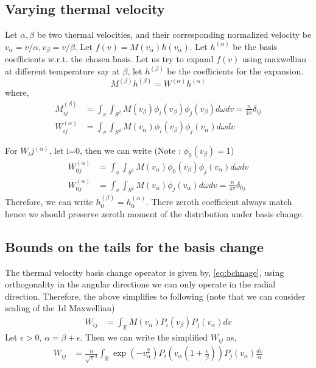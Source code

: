 \documentclass{article}
\newcommand{\reals}{\mathbb{R}}
\begin{document}
\subsection{Varying thermal velocity}
Let $\alpha,\beta$ be two thermal velocities, and their corresponding normalized velocity be $v_\alpha=v/\alpha,v_\beta=v/\beta$.
Let $f(v) = M(v_\alpha) h(v_\alpha)$. Let $h^{(\alpha)}$ be the basis coefficients w.r.t. the chosen basis. Let us try to expand $f(v)$ using maxwellian at different temperature say at $\beta$, let $h^{(\beta)}$ be the coefficients for the expansion.
\begin{equation}
    M^{(\beta)} h^{(\beta)} = W^{(\alpha)} h^{(\alpha)}
\end{equation} where, 
\begin{align}
    M^{(\beta)}_{ij} &= \int_{v} \int_{S^2} M(v_\beta) \phi_i(v_\beta) \phi_j(v_\beta) d\omega dv  = \frac{n}{4\pi} \delta_{ij} \\
    W^{(\alpha)}_{ij} &= \int_{v} \int_{S^2} M(v_\alpha) \phi_i(v_\beta) \phi_j(v_\alpha) d\omega dv   \label{eq:bchnage}
\end{align}

For $W_ij^{(\alpha)}$, let i=0, then we can write (Note : $\phi_0(v_\beta)=1$)
\begin{align*}
    W^{(\alpha)}_{0j} &= \int_{v} \int_{S^2} M(v_\alpha) \phi_0(v_\beta) \phi_j(v_\alpha) d\omega dv\\
    W^{(\alpha)}_{0j} &= \int_{v} \int_{S^2} M(v_\alpha) \phi_j(v_\alpha) d\omega dv = \frac{n}{4\pi} \delta_{0j}
\end{align*}
Therefore, we can write $h^{(\beta)}_0=h^{(\alpha)}_0$. There zeroth coefficient always match hence we should preserve zeroth moment of the distribution under basis change.  

\subsection{Bounds on the tails for the basis change}
The thermal velocity basis change operator is given by, \eqref{eq:bchnage}, using orthogonality in the angular directions we can only operate in the radial direction. Therefore, the above simplifies to following (note that we can consider scaling of the 1d Maxwellian)
\begin{align}
    W_{ij} &= \int_{\reals} M(v_\alpha) P_i(v_\beta) P_j(v_\alpha)dv \label{eq:basis_change}
\end{align}
Let $\epsilon >0$, $\alpha = \beta + \epsilon$. Then we can write the simplified $W_{ij}$ as, 
\begin{align}
    W_{ij} &= \frac{n}{\sqrt{\pi}^{3}}  \int_{\reals}  \exp(-v_\alpha^2) P_i (v_\alpha (1 + \frac{\epsilon}{\beta})) P_j(v_\alpha) \frac{dv}{\alpha} \\
\end{align}
\end{document}
